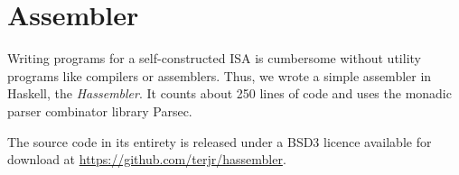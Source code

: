 \chapter{Assembler}

Writing programs for a self-constructed ISA is cumbersome without utility
programs like compilers or assemblers. Thus, we wrote a simple assembler in
Haskell, the \textit{Hassembler}. It counts about 250 lines of code and uses the
monadic parser combinator library Parsec.

The source code in its entirety is released under a BSD3 licence available for
download at \url{https://github.com/terjr/hassembler}.
